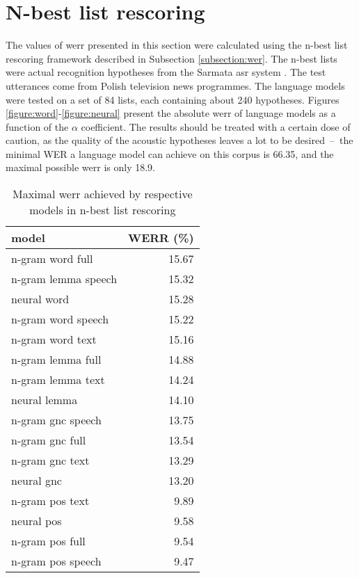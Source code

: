 \section{N-best list rescoring}
\label{section:nbest}
The values of \gls{werr} presented in this section were calculated using the n-best list rescoring framework described in Subsection \ref{subsection:wer}. The n-best lists were actual recognition hypotheses from the Sarmata \gls{asr} system \cite{ziolko2011automatic}. The test utterances come from Polish television news programmes. The language models were tested on a set of 84 lists, each containing about 240 hypotheses. Figures \ref{figure:word}-\ref{figure:neural} present the absolute \gls{werr} of language models as a function of the $\alpha$ coefficient. The results should be treated with a certain dose of caution, as the quality of the acoustic hypotheses leaves a lot to be desired~--~the minimal WER a language model can achieve on this corpus is 66.35, and the maximal possible \gls{werr} is only 18.9.  

\begin{table}[!htbp]
	\centering
	\caption{Maximal \gls{werr} achieved by respective models in n-best list rescoring}
	\label{table:max_werr}
	\begin{tabular*}{.4\linewidth}{@{\extracolsep{\fill}}lr}
		model  & WERR (\%)\\
		\midrule
		n-gram word full    & 15.67\\
		n-gram lemma speech  & 15.32\\
		neural word   & 15.28\\
		n-gram word speech  & 15.22\\
		n-gram word text    & 15.16\\
		n-gram lemma full    & 14.88\\
		n-gram lemma text    & 14.24\\
		neural lemma  & 14.10\\
		n-gram gnc speech & 13.75\\
		n-gram gnc full   & 13.54\\
		n-gram gnc text   & 13.29\\
		neural gnc    & 13.20\\
		n-gram pos text   & 9.89\\
		neural pos    & 9.58\\
		n-gram pos full   & 9.54\\
		n-gram pos speech & 9.47\\
	\end{tabular*}
\end{table}

